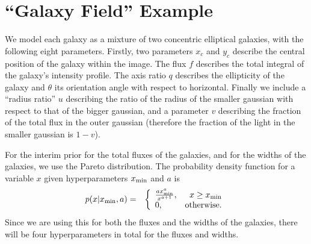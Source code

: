\documentclass[letterpaper, 11pt]{article}
\begin{document}
\section{``Galaxy Field'' Example}

We model each galaxy as a mixture of two concentric elliptical galaxies, with
the following eight parameters. Firstly, two
parameters $x_c$ and $y_c$ describe the central position of the galaxy within
the image. The flux $f$ describes the total integral of the galaxy's
intensity profile. The axis ratio $q$ describes the ellipticity of the galaxy
and $\theta$ its orientation angle with respect to horizontal. Finally
we include a ``radius ratio'' $u$ describing the ratio of the radius of the
smaller gaussian with respect to that of the bigger gaussian, and a parameter
$v$ describing the fraction of the total flux in the outer gaussian
(therefore the fraction of the light in the smaller gaussian is $1-v$).

For the interim prior for the total fluxes of the galaxies, and for the
widths of the galaxies, we use the Pareto
distribution. The probability density function for a variable $x$ given
hyperparameters $x_{\rm min}$ and $a$ is
\begin{eqnarray}
p(x | x_{\rm min}, a) &=&
\left\{
\begin{array}{lr}
\frac{a x_{\rm min}^{a}}{x^{a + 1}}, & x \geq x_{\rm min}\\
0, & \textnormal{otherwise.}
\end{array}
\right.
\end{eqnarray}
Since we are using this for both the fluxes and the widths of the galaxies,
there will be four hyperparameters in total for the fluxes and widths.
\end{document}
